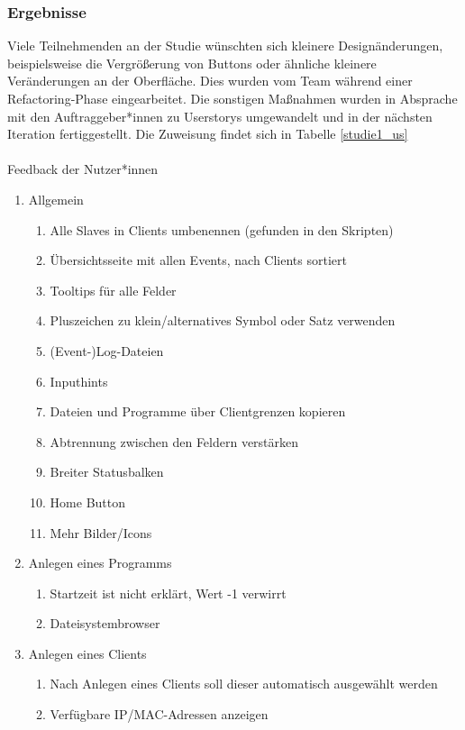 \documentclass[accentcolor=tud9c,12pt,paper=a4]{tudreport}
\begin{document}
	\subsubsection{Ergebnisse}
	Viele Teilnehmenden an der Studie wünschten sich kleinere Designänderungen, beispielsweise die Vergrößerung von
	Buttons oder ähnliche kleinere Veränderungen an der Oberfläche. Dies wurden vom Team während einer Refactoring-Phase
	eingearbeitet. Die sonstigen Maßnahmen wurden in Absprache mit den Auftraggeber*innen zu Userstorys umgewandelt und
	in der nächsten Iteration fertiggestellt. Die Zuweisung findet sich in Tabelle \ref{studie1_us}
	\\\\
	{\large Feedback der Nutzer*innen\\}
	\begin{enumerate}
	\item Allgemein
	\begin{enumerate}
		\item Alle Slaves in Clients umbenennen (gefunden in den Skripten)
		\item Übersichtsseite mit allen Events, nach Clients sortiert
    		\item Tooltips für alle Felder
		\item Pluszeichen zu klein/alternatives Symbol oder Satz verwenden
		\item (Event-)Log-Dateien
    		\item Inputhints
    		\item Dateien und Programme über Clientgrenzen kopieren
    		\item Abtrennung zwischen den Feldern verstärken
    		\item Breiter Statusbalken
    		\item Home Button
    		\item Mehr Bilder/Icons
	\end{enumerate}
	\item Anlegen eines Programms
	\begin{enumerate}
    		\item Startzeit ist nicht erklärt, Wert -1 verwirrt
   		\item Dateisystembrowser
	\end{enumerate}
	\item Anlegen eines Clients
	\begin{enumerate}
   		 \item Nach Anlegen eines Clients soll dieser automatisch ausgewählt werden
   		 \item Verfügbare IP/MAC-Adressen anzeigen

\end{enumerate}
\end{enumerate}
\end{document}
